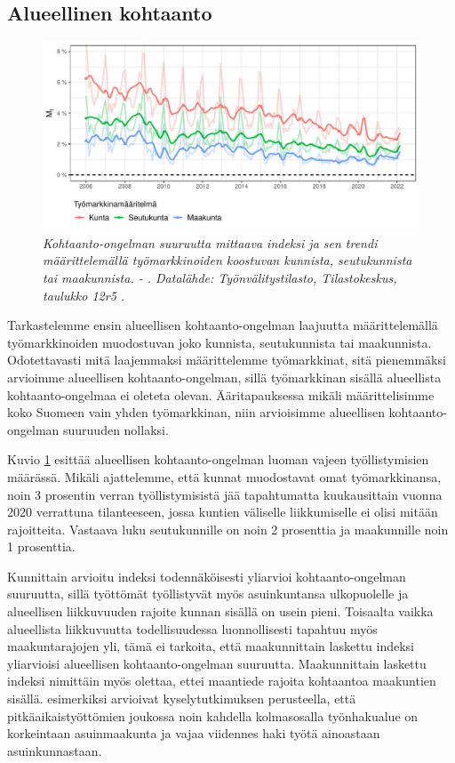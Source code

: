 \documentclass[12pt]{article}
\newcommand{\lastdatamonth}{\unskip}
\newcommand{\firstdatamonth}{\unskip}
\newcommand{\newcaption}[1]{\caption{\textit{\footnotesize{#1}}}}
\begin{document}
\subsection{Alueellinen kohtaanto} \label{section:alueellinen_kohtaanto}

\begin{figure}
\centering
\includegraphics[scale = 0.8]{../kuviot/indeksi_alueittain.pdf}
    \newcaption{Kohtaanto-ongelman suuruutta mittaava indeksi ja sen trendi määrittelemällä työmarkkinoiden koostuvan kunnista, seutukunnista tai maakunnista.  \protect \firstdatamonth \phantom{} - \protect\lastdatamonth. Datalähde: Työnvälitystilasto, Tilastokeskus, taulukko 12r5 \protect \cite{svt2011}.}
   \label{fig:kdieksl}
\end{figure}


Tarkastelemme ensin alueellisen kohtaanto-ongelman laajuutta määrittelemällä työmarkkinoiden muodostuvan joko kunnista, seutukunnista tai maakunnista. Odotettavasti mitä laajemmaksi määrittelemme työmarkkinat, sitä pienemmäksi arvioimme alueellisen kohtaanto-ongelman, sillä työmarkkinan sisällä alueellista kohtaanto-ongelmaa ei oleteta olevan. Ääritapauksessa mikäli määrittelisimme koko Suomeen vain yhden työmarkkinan, niin arvioisimme alueellisen kohtaanto-ongelman suuruuden nollaksi.

Kuvio \ref{fig:kdieksl} esittää alueellisen kohtaanto-ongelman luoman vajeen työllistymisien määrässä. Mikäli ajattelemme, että kunnat muodostavat omat työmarkkinansa, noin 3 prosentin verran työllistymisistä jää tapahtumatta kuukausittain vuonna 2020 verrattuna tilanteeseen, jossa kuntien väliselle liikkumiselle ei olisi mitään rajoitteita. Vastaava luku seutukunnille on noin 2 prosenttia ja maakunnille noin 1 prosenttia. 

Kunnittain arvioitu indeksi todennäköisesti yliarvioi kohtaanto-ongelman suuruutta, sillä työttömät työllistyvät myös asuinkuntansa ulkopuolelle \cite{alasalmi2020tyon} ja alueellisen liikkuvuuden rajoite kunnan sisällä on usein pieni. Toisaalta vaikka alueellista liikkuvuutta todellisuudessa luonnollisesti tapahtuu myös maakuntarajojen yli, tämä ei tarkoita, että maakunnittain laskettu indeksi yliarvioisi alueellisen kohtaanto-ongelman suuruutta. Maakunnittain laskettu indeksi nimittäin myös olettaa, ettei maantiede rajoita kohtaantoa maakuntien sisällä.  esimerkiksi arvioivat kyselytutkimuksen perusteella, että pitkäaikaistyöttömien joukossa noin kahdella kolmasosalla työnhakualue on korkeintaan asuinmaakunta ja vajaa viidennes haki työtä ainoastaan asuinkunnastaan.  
\end{document}
